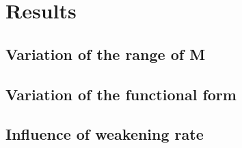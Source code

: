 \pagebreak
\section{Results}

\subsection{Variation of the range of M}
\subsection{Variation of the functional form}
\subsection{Influence of weakening rate}
